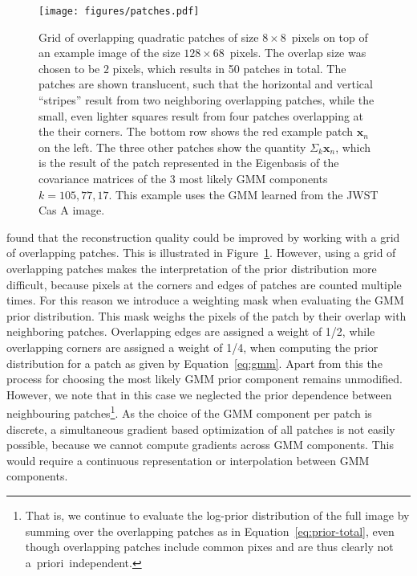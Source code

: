 \documentclass[twocolumn]{aastex631}
\newcommand{\aprioir}{a~priori~}
\begin{document}
 \begin{figure}
        \begin{centering}
            \texttt{[image: figures/patches.pdf]}
            \caption{
                Grid of overlapping quadratic patches of size $8\times8$~pixels on top of an example image of the size $128 \times 68$~pixels. The overlap size was chosen to be $2$ pixels, which results in 50 patches in total. The patches are shown translucent, such that the horizontal and vertical \enquote{stripes} result from two neighboring overlapping patches, while the small, even lighter squares result from four patches overlapping at the their corners. The bottom row shows the red example patch $\mathbf{x}_n$ on the left. The three other patches show the quantity $\Sigma_{k} \mathbf{x}_n$, which is the result of the patch represented in the Eigenbasis of the covariance matrices of the 3 most likely GMM components $k = 105, 77, 17$. This example uses the GMM learned from the JWST Cas A image.
            }
            \label{fig:patches}
        \end{centering}
    \end{figure}


    \cite{Zoran2011} found that the reconstruction quality could be improved by working with a grid of overlapping patches. This is illustrated in Figure~\ref{fig:patches}. However, using a grid of overlapping patches makes the interpretation of the prior distribution more difficult, because pixels at the corners and edges of patches are counted multiple times. For this reason we introduce a weighting mask when evaluating the GMM prior distribution.
    This mask weighs the pixels of the patch by their overlap with neighboring patches. Overlapping edges are assigned a weight of 1/2, while overlapping corners are assigned a weight of 1/4, when computing the prior distribution for a patch as given by  Equation~\ref{eq:gmm}. Apart from this the process for choosing the most likely GMM prior component remains unmodified. However, we note that in this case we neglected the prior dependence between neighbouring patches\footnote{That is, we continue to evaluate the log-prior distribution of the full image by summing over the overlapping patches as in Equation~\ref{eq:prior-total}, even though overlapping patches include common pixes and are thus clearly not \aprioir independent.}. As the choice of the GMM component per patch is discrete, a simultaneous gradient based optimization of all patches is not easily possible, because we cannot compute gradients across GMM components. This would require a continuous representation or interpolation between GMM components.
   
\end{document}
